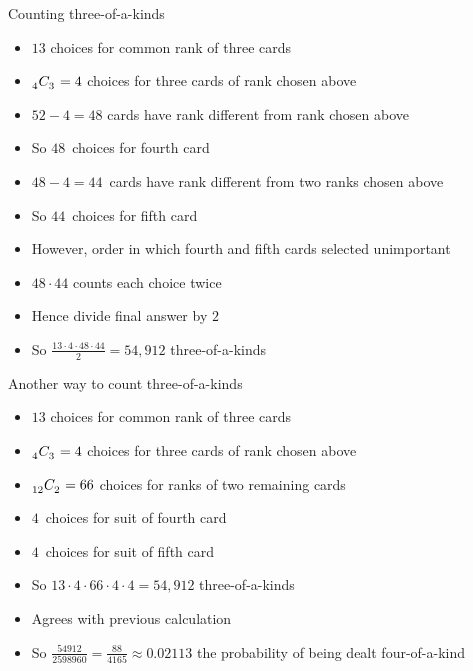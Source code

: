 \documentclass[handout]{beamer}
\theoremstyle{definition}
\newcommand\ncr[2]{\tensor[_{#1}]C{_{#2}}}
\begin{document}
\begin{frame}{Counting three-of-a-kinds}
\begin{itemize}
\item $13$ choices for common rank of three cards
\item $\ncr{4}{3}=4$ choices for three cards of rank chosen above
\item $52-4=48$ cards have rank different from rank chosen above
\item So $48$~choices for fourth card
\item $48-4=44$~cards have rank different from two ranks chosen above
\item So $44$~choices for fifth card
\item However, order in which fourth and fifth cards selected unimportant
\item $48\cdot 44$ counts each choice \alert{twice}
\item Hence divide final answer by $2$
\item So $\frac{13\cdot 4\cdot 48\cdot 44}{2}=54,912$ three-of-a-kinds
\end{itemize}
\end{frame}

\begin{frame}{Another way to count three-of-a-kinds}
\begin{itemize}
\item $13$ choices for common rank of three cards
\item $\ncr{4}{3}=4$ choices for three cards of rank chosen above
\item $\ncr{12}{2}=66$ choices for ranks of two remaining cards
\item $4$~choices for suit of fourth card 
\item $4$~choices for suit of fifth card 
\item So $13\cdot 4\cdot 66\cdot 4\cdot 4=54,912$ three-of-a-kinds
\item Agrees with previous calculation
\item So $\frac{54912}{2598960}=\frac{88}{4165}\approx 0.02113$ the probability
of being dealt four-of-a-kind
\end{itemize}
\end{frame}
\end{document}
